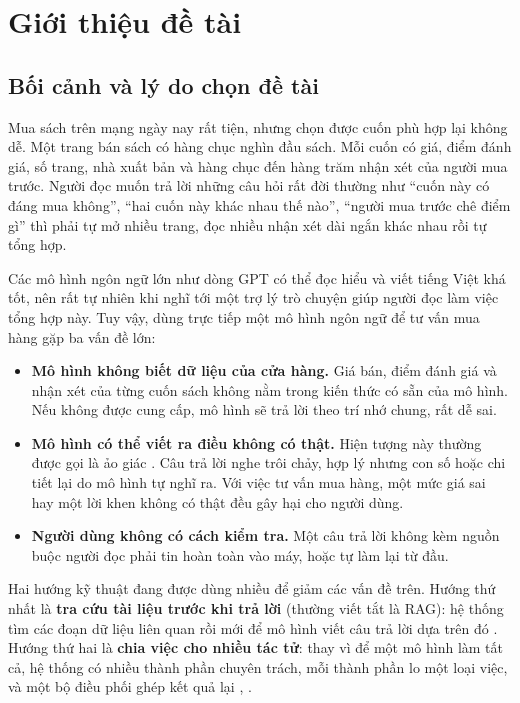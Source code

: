 \chapter{Giới thiệu đề tài}
\label{ch:gioi-thieu}

\section{Bối cảnh và lý do chọn đề tài}

Mua sách trên mạng ngày nay rất tiện, nhưng chọn được cuốn phù hợp lại không dễ. Một trang bán sách có hàng chục nghìn đầu sách. Mỗi cuốn có giá, điểm đánh giá, số trang, nhà xuất bản và hàng chục đến hàng trăm nhận xét của người mua trước. Người đọc muốn trả lời những câu hỏi rất đời thường như ``cuốn này có đáng mua không'', ``hai cuốn này khác nhau thế nào'', ``người mua trước chê điểm gì'' thì phải tự mở nhiều trang, đọc nhiều nhận xét dài ngắn khác nhau rồi tự tổng hợp.

Các mô hình ngôn ngữ lớn như dòng GPT có thể đọc hiểu và viết tiếng Việt khá tốt, nên rất tự nhiên khi nghĩ tới một trợ lý trò chuyện giúp người đọc làm việc tổng hợp này. Tuy vậy, dùng trực tiếp một mô hình ngôn ngữ để tư vấn mua hàng gặp ba vấn đề lớn:

\begin{itemize}
    \item \textbf{Mô hình không biết dữ liệu của cửa hàng.} Giá bán, điểm đánh giá và nhận xét của từng cuốn sách không nằm trong kiến thức có sẵn của mô hình. Nếu không được cung cấp, mô hình sẽ trả lời theo trí nhớ chung, rất dễ sai.
    \item \textbf{Mô hình có thể viết ra điều không có thật.} Hiện tượng này thường được gọi là ảo giác . Câu trả lời nghe trôi chảy, hợp lý nhưng con số hoặc chi tiết lại do mô hình tự nghĩ ra. Với việc tư vấn mua hàng, một mức giá sai hay một lời khen không có thật đều gây hại cho người dùng.
    \item \textbf{Người dùng không có cách kiểm tra.} Một câu trả lời không kèm nguồn buộc người đọc phải tin hoàn toàn vào máy, hoặc tự làm lại từ đầu.
\end{itemize}

Hai hướng kỹ thuật đang được dùng nhiều để giảm các vấn đề trên. Hướng thứ nhất là \textbf{tra cứu tài liệu trước khi trả lời} (thường viết tắt là RAG): hệ thống tìm các đoạn dữ liệu liên quan rồi mới để mô hình viết câu trả lời dựa trên đó . Hướng thứ hai là \textbf{chia việc cho nhiều tác tử}: thay vì để một mô hình làm tất cả, hệ thống có nhiều thành phần chuyên trách, mỗi thành phần lo một loại việc, và một bộ điều phối ghép kết quả lại , .


